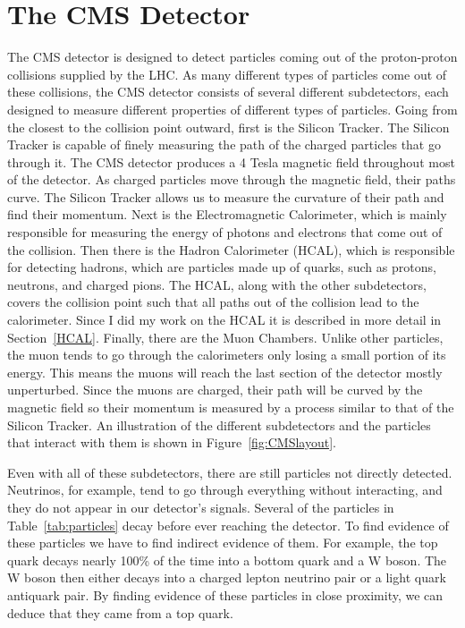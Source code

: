 \section{The CMS Detector}
The CMS detector is designed to detect particles coming out of the proton-proton collisions supplied by the LHC. As many different types of particles come out of these collisions, the CMS detector consists of several different subdetectors, each designed to measure different properties of different types of particles. Going from the closest to the collision point outward, first is the Silicon Tracker. The Silicon Tracker is capable of finely measuring the path of the charged particles that go through it. The CMS detector produces a 4 Tesla magnetic field throughout most of the detector. As charged particles move through the magnetic field, their paths curve. The Silicon Tracker allows us to measure the curvature of their path and find their momentum. Next is the Electromagnetic Calorimeter, which is mainly responsible for measuring the energy of photons and electrons that come out of the collision. Then there is the Hadron Calorimeter (HCAL), which is responsible for detecting hadrons, which are particles made up of quarks, such as protons, neutrons, and charged pions. The HCAL, along with the other subdetectors, covers the collision point such that all paths out of the collision lead to the calorimeter. Since I did my work on the HCAL it is described in more detail in Section~\ref{HCAL}. Finally, there are the Muon Chambers. Unlike other particles, the muon tends to go through the calorimeters only losing a small portion of its energy. This means the muons will reach the last section of the detector mostly unperturbed. Since the muons are charged, their path will be curved by the magnetic field so their momentum is measured by a process similar to that of the Silicon Tracker. An illustration of the different subdetectors and the particles that interact with them is shown in Figure~\ref{fig:CMSlayout}.

Even with all of these subdetectors, there are still particles not directly detected. Neutrinos, for example, tend to go through everything without interacting, and they do not appear in our detector's signals. Several of the particles in Table~\ref{tab:particles} decay before ever reaching the detector. To find evidence of these particles we have to find indirect evidence of them. For example, the top quark decays nearly 100\% of the time into a bottom quark and a W boson. The W boson then either decays into a charged lepton neutrino pair or a light quark antiquark pair. By finding evidence of these particles in close proximity, we can deduce that they came from a top quark.

